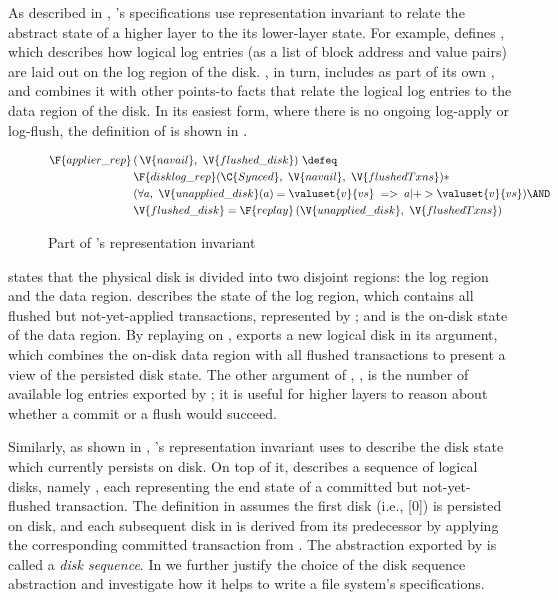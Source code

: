 As described in , \syslog's specifications use
representation invariant to relate the abstract state of a higher layer to
the its lower-layer state.  For example, \disklog defines
, which describes how logical log entries (as a list of
block address and value pairs) are laid out on the log region of the disk.
\memlog, in turn, includes  as part of its own
, and combines it with other points-to facts that
relate the logical log entries to the data region of the disk.  In its
easiest form, where there is no ongoing log-apply or log-flush, the
definition of  is shown in .

\begin{figure}[htb]
\centering
\specfont
\begin{equation*}
\begin{aligned}
  \F{applier\_rep}\,
  & (\,\V{navail}, ~\V{flushed\_disk})~\defeq \\
  & \F{disklog\_rep}(\C{Synced},~\V{navail},~\V{flushedTxns}) * \\
     &(\forall a, ~\V{unapplied\_disk}(a) = \valuset{v}{vs} \; =>\;
          a |+> \valuset{v}{vs}) \AND \\
  & \V{flushed\_disk} = \F{replay}\,(\V{unapplied\_disk}, ~\V{flushedTxns})
\end{aligned}
\end{equation*}
\caption{Part of \memlog's representation invariant}
\label{fig:applier_rep}
\end{figure}

 states that the physical disk is divided into two
disjoint regions: the log region and the data region. 
describes the state of the log region, which contains all flushed but
not-yet-applied transactions, represented by ; and
 is the on-disk state of the data region.  By replaying
 on ,  exports a new
logical disk  in its argument, which combines the on-disk
data region with all flushed transactions to present a view of the
persisted disk state.  The other argument of , ,
is the number of available log entries exported by \disklog; it is useful
for higher layers to reason about whether a commit or a flush would
succeed.

Similarly, as shown in , \grouplog's representation
invariant  uses  to describe the disk state
which currently persists on disk.  On top of it,  describes
a sequence of logical disks, namely , each representing the
end state of a committed but not-yet-flushed transaction.  The definition
in  assumes the first disk (i.e., {[0]})
is persisted on disk, and each subsequent disk in  is derived
from its predecessor by applying the corresponding committed transaction
from .  The abstraction exported by  is
called a \emph{disk sequence}. In  we further justify the
choice of the disk sequence abstraction and investigate how it helps to
write a file system's specifications.

